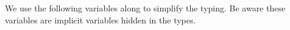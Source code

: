 We use the following variables along to simplify the typing. Be aware these
variables are implicit variables hidden in the types.

\begin{code}%
\>[0]\<%
\\
\>[0][@{}l@{\AgdaIndent{0}}]%
\>[2]\AgdaSpace{}%
\AgdaSpace{}%
\AgdaSpace{}%
\AgdaSpace{}%
\AgdaSymbol{:}\AgdaSpace{}%
\<%
\end{code}
